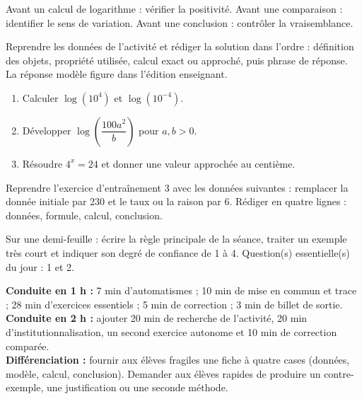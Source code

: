 \begin{traceecrite}Avant un calcul de logarithme : vérifier la positivité. Avant une comparaison : identifier le sens de variation. Avant une conclusion : contrôler la vraisemblance.\end{traceecrite}

\begin{exemple}
Reprendre les données de l'activité et rédiger la solution dans l'ordre : définition des objets, propriété utilisée, calcul exact ou approché, puis phrase de réponse. La réponse modèle figure dans l'édition enseignant.
\end{exemple}

\begin{exercice}[-- essentiel]
\begin{enumerate}\item Calculer $\log(10^4)$ et $\log(10^{-4})$.\item Développer $\log\!\left(\dfrac{100a^2}{b}\right)$ pour $a,b>0$.\item Résoudre $4^x=24$ et donner une valeur approchée au centième.\end{enumerate}
\end{exercice}


\begin{dm}Reprendre l'exercice d'entraînement 3 avec les données suivantes : remplacer la donnée initiale par $230$ et le taux ou la raison par $6$. Rédiger en quatre lignes : données, formule, calcul, conclusion.\end{dm}

\begin{sortie}Sur une demi-feuille : écrire la règle principale de la séance, traiter un exemple très court et indiquer son degré de confiance de 1 à 4. Question(s) essentielle(s) du jour : 1 et 2.\end{sortie}

\ifprof
\begin{methode}
\textbf{Conduite en 1 h :} 7 min d'automatismes ; 10 min de mise en commun et trace ; 28 min d'exercices essentiels ; 5 min de correction ; 3 min de billet de sortie.\\
\textbf{Conduite en 2 h :} ajouter 20 min de recherche de l'activité, 20 min d'institutionnalisation, un second exercice autonome et 10 min de correction comparée.\\
\textbf{Différenciation :} fournir aux élèves fragiles une fiche à quatre cases (données, modèle, calcul, conclusion). Demander aux élèves rapides de produire un contre-exemple, une justification ou une seconde méthode.
\end{methode}
\fi
